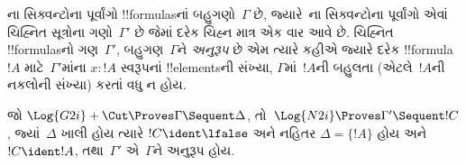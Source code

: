 \documentclass[../../../include/open-logic-section]{subfiles}
\begin{document}


ના સિક્વન્ટોના
પૂર્વાંગો !!{formula}sનાં
બહુગણો~$\Gamma$ છે,
જ્યારે~ના
સિક્વન્ટોના પૂર્વાંગો
એવાં ચિહ્નિત સૂત્રોના
ગણો~$\Gamma'$ છે
જેમાં દરેક ચિહ્ન માત્ર
એક વાર આવે છે.
ચિહ્નિત !!{formula}sનો
ગણ~$\Gamma'$,
બહુગણ~$\Gamma$ને
\emph{અનુરૂપ} છે એમ
ત્યારે કહીએ જ્યારે
દરેક !!{formula}~$!A$
માટે~$\Gamma'$માંના
$x : !A$ સ્વરૂપનાં
!!{element}sની સંખ્યા,
$\Gamma$માં~$!A$ની
બહુલતા (એટલે~$!A$ની
નકલોની સંખ્યા)
કરતાં વધુ ન હોય.

\begin{prop}
જો $\Log{G2i} + \Cut \Proves \Gamma \Sequent \Delta$,
તો~$\Log{N2i}
\Proves \Gamma' \Sequent !C$,
જ્યાં~$\Delta$ ખાલી
હોય ત્યારે
$!C \ident \lfalse$
અને નહિતર
$\Delta = \{!A\}$ હોય અને $!C \ident !A$,
તથા~$\Gamma'$ એ~$\Gamma$ને
અનુરૂપ હોય.
\end{prop}
\end{document}
